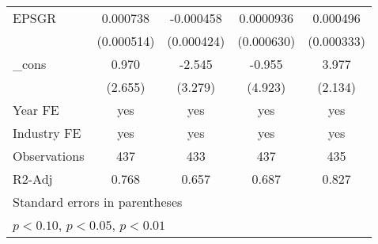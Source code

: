 \begin{table}[htbp]
\begin{tabular}{l*{4}{c}}
EPSGR               &    0.000738         &   -0.000458         &   0.0000936         &    0.000496         \\
                    &  (0.000514)         &  (0.000424)         &  (0.000630)         &  (0.000333)         \\
\_cons              &       0.970         &      -2.545         &      -0.955         &       3.977\sym{*}  \\
                    &     (2.655)         &     (3.279)         &     (4.923)         &     (2.134)         \\
\hline
Year FE             &         yes         &         yes         &         yes         &         yes         \\
Industry FE         &         yes         &         yes         &         yes         &         yes         \\
Observations        &         437         &         433         &         437         &         435         \\
R2-Adj              &       0.768         &       0.657         &       0.687         &       0.827         \\
\hline\hline
\multicolumn{5}{l}{\footnotesize Standard errors in parentheses}\\
\multicolumn{5}{l}{\footnotesize \sym{*} \(p<0.10\), \sym{**} \(p<0.05\), \sym{***} \(p<0.01\)}\\
\end{tabular}
\end{table}

